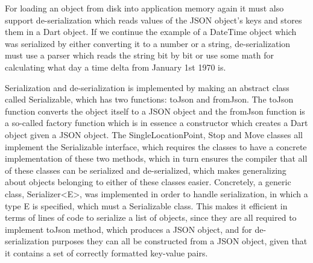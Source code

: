 For loading an object from disk into application memory again it must also support de-serialization which reads values of the JSON object's keys and stores them in a Dart object. If we continue the example of a DateTime object which was serialized by either converting it to a number or a string, de-serialization must use a parser which reads the string bit by bit or use some math for calculating what day a time delta from January 1st 1970 is. 

Serialization and de-serialization is implemented by making an abstract class called Serializable, which has two functions: toJson and fromJson. The toJson function converts the object itself to a JSON object and the fromJson function is a so-called factory function which is in essence a constructor which creates a Dart object given a JSON object. The SingleLocationPoint, Stop and Move classes all implement the Serializable interface, which requires the classes to have a concrete implementation of these two methods, which in turn ensures the compiler that all of these classes can be serialized and de-serialized, which makes generalizing about objects belonging to either of these classes easier. Concretely, a generic class, Serializer<E>, was implemented in order to handle serialization, in which a type E is specified, which must a Serializable class. This makes it efficient in terms of lines of code to serialize a list of objects, since they are all required to implement toJson method, which produces a JSON object, and for de-serialization purposes they can all be constructed from a JSON object, given that it contains a set of correctly formatted key-value pairs.


